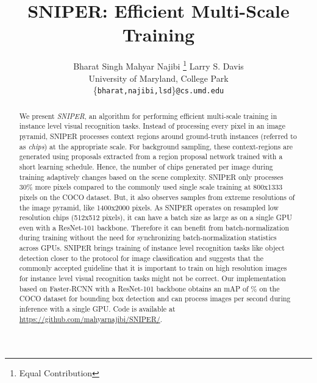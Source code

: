 \documentclass{article}
\title{SNIPER: Efficient Multi-Scale Training}
\author{
  Bharat Singh   \hspace{1.5cm}  Mahyar Najibi \thanks{Equal Contribution} \hspace{1.5cm}  Larry S. Davis \\
  University of Maryland, College Park\\
  \{\texttt{bharat,najibi,lsd}\}\texttt{@cs.umd.edu} 
}
\begin{document}
\maketitle

\begin{abstract}
We present \textit{SNIPER}, an algorithm for performing efficient multi-scale training in instance level visual recognition tasks. Instead of processing every pixel in an image pyramid, SNIPER processes context regions around ground-truth instances (referred to as \textit{chips}) at the appropriate scale. For background sampling, these context-regions are generated using proposals extracted from a region proposal network trained with a short learning schedule. Hence, the number of chips generated per image during training adaptively changes based on the scene complexity. SNIPER only processes 30\% more pixels compared to the commonly used single scale training at 800x1333 pixels on the COCO dataset. But, it also observes samples from extreme resolutions of the image pyramid, like 1400x2000 pixels. As SNIPER operates on resampled low resolution chips (512x512 pixels), it can have a batch size as large as  on a single GPU even with a ResNet-101 backbone. Therefore it can benefit from batch-normalization during training without the need for synchronizing batch-normalization statistics across GPUs. SNIPER brings training of instance level recognition tasks like object detection closer to the protocol for image classification and suggests that the commonly accepted guideline that it is important to train on high resolution images for instance level visual recognition tasks might not be correct. Our implementation based on Faster-RCNN with a ResNet-101 backbone obtains an mAP of \% on the COCO dataset for bounding box detection and can process  images per second during inference with a single GPU. Code is available at \url{https://github.com/mahyarnajibi/SNIPER/}.
 
\end{abstract}
\end{document}
